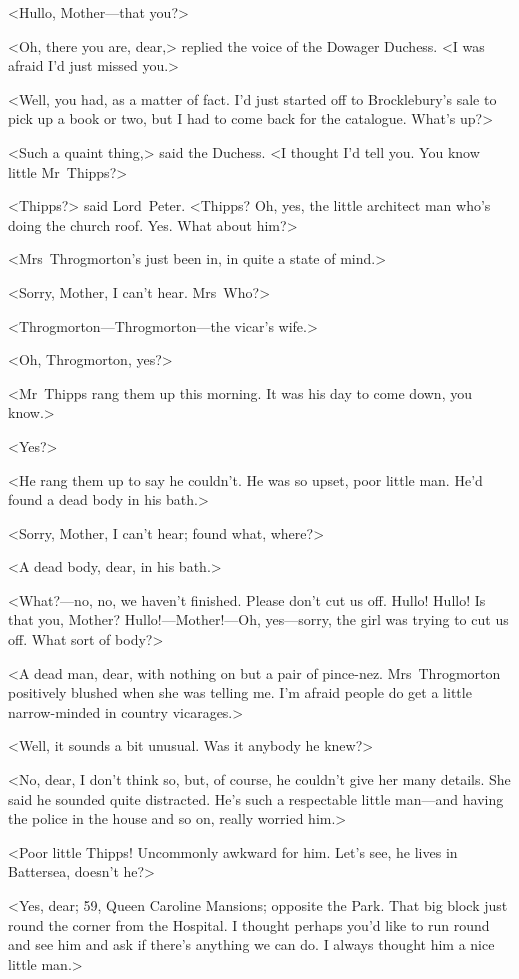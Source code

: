 <Hullo, Mother—that you?>

<Oh, there you are, dear,> replied the voice of the Dowager Duchess. <I was afraid I'd just missed you.>

<Well, you had, as a matter of fact. I'd just started off to Brocklebury's sale to pick up a book or two, but I had to come back for the catalogue. What's up?>

<Such a quaint thing,> said the Duchess. <I thought I'd tell you. You know little Mr~Thipps?>

<Thipps?> said Lord~Peter. <Thipps? Oh, yes, the little architect man who's doing the church roof. Yes. What about him?>

<Mrs~Throgmorton's just been in, in quite a state of mind.>

<Sorry, Mother, I can't hear. Mrs~Who?>

<Throgmorton—Throgmorton—the vicar's wife.>

<Oh, Throgmorton, yes?>

<Mr~Thipps rang them up this morning. It was his day to come down, you know.>

<Yes?>

<He rang them up to say he couldn't. He was so upset, poor little man. He'd found a dead body in his bath.>

<Sorry, Mother, I can't hear; found what, where?>

<A dead body, dear, in his bath.>

<What?—no, no, we haven't finished. Please don't cut us off. Hullo! Hullo! Is that you, Mother? Hullo!—Mother!—Oh, yes—sorry, the girl was trying to cut us off. What sort of body?>

<A dead man, dear, with nothing on but a pair of pince-nez. Mrs~Throgmorton positively blushed when she was telling me. I'm afraid people do get a little narrow-minded in country vicarages.>

<Well, it sounds a bit unusual. Was it anybody he knew?>

<No, dear, I don't think so, but, of course, he couldn't give her many details. She said he sounded quite distracted. He's such a respectable little man—and having the police in the house and so on, really worried him.>

<Poor little Thipps! Uncommonly awkward for him. Let's see, he lives in Battersea, doesn't he?>

<Yes, dear; 59, Queen Caroline Mansions; opposite the Park. That big block just round the corner from the Hospital. I thought perhaps you'd like to run round and see him and ask if there's anything we can do. I always thought him a nice little man.>

